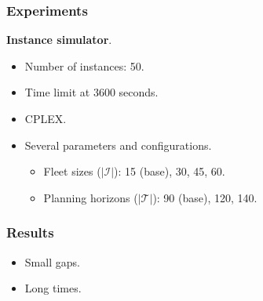 \begin{frame}
\frametitle{\textbf{\firsttitleS}}
    
\end{frame}

\begin{frame}
\frametitle{\textbf{Experiments}}

  \textbf{Instance simulator}.
  \pause
  \begin{itemize}
    \item Number of instances: 50.  
    \item Time limit at 3600 seconds.
    \item CPLEX.
    \item Several parameters and configurations.
    \begin{itemize}
      \item Fleet sizes ($|\mathcal{I}|$): 15 (base), 30, 45, 60.
      \item Planning horizons ($|\mathcal{T}|$): 90 (base), 120, 140.
    \end{itemize}
  \end{itemize}
\end{frame}

\begin{frame}
\frametitle{\textbf{Results}}

  \begin{itemize}[<+->]
    \item Small gaps.
    \item Long times.
  \end{itemize}
  
\end{frame}

